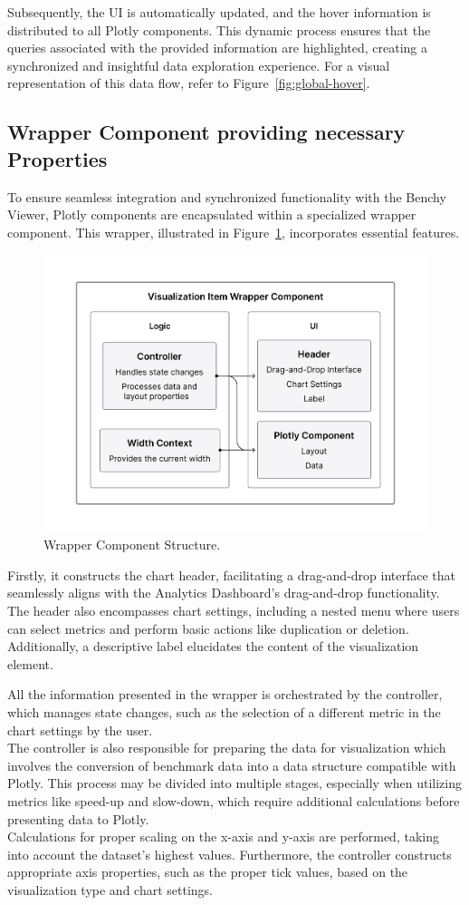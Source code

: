 Subsequently, the UI is automatically updated, and the hover information is distributed to all Plotly components. This dynamic process ensures that the queries associated with the provided information are highlighted, creating a synchronized and insightful data exploration experience. For a visual representation of this data flow, refer to Figure~\ref{fig:global-hover}.

\subsection{Wrapper Component providing necessary Properties}
To ensure seamless integration and synchronized functionality with the Benchy Viewer, Plotly components are encapsulated within a specialized wrapper component. This wrapper, illustrated in Figure~\ref{fig:chart-wrapper}, incorporates essential features.

\begin{figure}[h]
  \centering
  \includegraphics[width=0.6\linewidth]{figures/chart-wrapper.png}
  \caption{Wrapper Component Structure.}
  \label{fig:chart-wrapper}
\end{figure}

Firstly, it constructs the chart header, facilitating a drag-and-drop interface that seamlessly aligns with the Analytics Dashboard's drag-and-drop functionality. The header also encompasses chart settings, including a nested menu where users can select metrics and perform basic actions like duplication or deletion. Additionally, a descriptive label elucidates the content of the visualization element.

All the information presented in the wrapper is orchestrated by the controller, which manages state changes, such as the selection of a different metric in the chart settings by the user.\\
The controller is also responsible for preparing the data for visualization which involves the conversion of benchmark data into a data structure compatible with Plotly. This process may be divided into multiple stages, especially when utilizing metrics like speed-up and slow-down, which require additional calculations before presenting data to Plotly.\\
Calculations for proper scaling on the x-axis and y-axis are performed, taking into account the dataset's highest values. Furthermore, the controller constructs appropriate axis properties, such as the proper tick values, based on the visualization type and chart settings.

